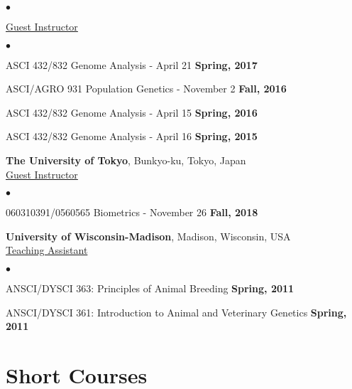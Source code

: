 \documentclass[margin,line,10pt]{res}
\newenvironment{list2}{
  \begin{list}{$\bullet$}{%
      \setlength{\itemsep}{0in}
      \setlength{\parsep}{0in} \setlength{\parskip}{0in}
      \setlength{\topsep}{0in} \setlength{\partopsep}{0in} 
      \setlength{\leftmargin}{0.2in}}}{\end{list}}
\begin{document}
\begin{resume}
\begin{list2}
\end{list2}

 \vspace{.01pt}

\underline{Guest Instructor}
 \vspace{0.2cm}
 \begin{list2}
 \item ASCI 432/832 Genome Analysis - April 21  \hfill {\bf Spring, 2017}
\vspace{.01pt}
\item ASCI/AGRO 931  Population Genetics - November 2  \hfill {\bf Fall, 2016}
\vspace{.01pt}
\item ASCI 432/832 Genome Analysis - April 15  \hfill {\bf Spring, 2016}
\vspace{.01pt}
\item ASCI 432/832 Genome Analysis - April 16    \hfill {\bf Spring, 2015}
\end{list2}

 
{\bf The University of Tokyo}, Bunkyo-ku, Tokyo, Japan \vspace{0.2cm} \\
\underline{Guest Instructor}
\vspace{0.2cm}
 \begin{list2}
 \item 060310391/0560565 Biometrics - November 26 \hfill {\bf Fall, 2018}
 \end{list2}

 
{\bf University of Wisconsin-Madison}, Madison, Wisconsin, USA  \vspace{0.2cm}  \\
\underline{Teaching Assistant} 
 \vspace{0.2cm}
\begin{list2}
\item ANSCI/DYSCI 363: Principles of Animal Breeding    \hfill {\bf Spring, 2011}

\vspace{.01pt}
\item ANSCI/DYSCI 361: Introduction to Animal and Veterinary Genetics    \hfill {\bf Spring, 2011} 

  \end{list2}



\vspace{0.5cm}
\section{\sc Short Courses}



\end{resume}
\end{document}
